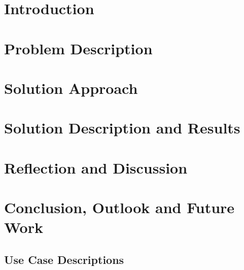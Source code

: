 
\section{Introduction} \label{sec:intro}


\section{Problem Description} \label{sec:probdesc}


\section{Solution Approach} \label{sec:solapp}


\section{Solution Description and Results} \label{sec:soldesc}


\section{Reflection and Discussion} \label{sec:reflect}


\section{Conclusion, Outlook and Future Work} \label{sec:conclusion}



\nocite{*}

\label{sec:ref}
\label{EndOfMainMatter}
\newpage
\setcounter{page}{1}
\begin{appendices}

	\section{Use Case Descriptions}
	
	

\end{appendices}